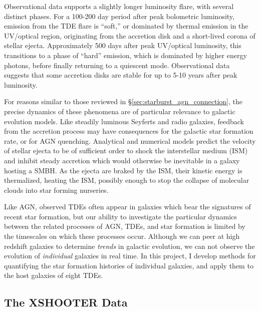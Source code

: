 \documentclass[a4paper,11pt]{article}
\begin{document}
Observational data supports a slightly longer luminosity flare, with several distinct phases. For a 100-200 day period after peak bolometric luminosity, emission from the TDE flare is ``soft,'' or dominated by thermal emission in the UV/optical region, originating from the accretion disk and a short-lived corona of stellar ejecta. Approximately 500 days after peak UV/optical luminosity, this transitions to a phase of ``hard'' emission, which is dominated by higher energy photons, before finally returning to a quiescent mode.\cite{Wevers_2021} Observational data suggests that some accretion disks are stable for up to 5-10 years after peak luminosity.\cite{van_Velzen_2019}

For reasons similar to those reviewed in \S\ref{sec:starburst_agn_connection}, the precise dynamics of these phenomena are of particular relevance to galactic evolution models. Like steadily luminous Seyferts and radio galaxies, feedback from the accretion process may have consequences for the galactic star formation rate, or for AGN quenching. Analytical and numerical models predict the velocity of stellar ejecta to be of sufficient order to shock the interstellar medium (ISM) and inhibit steady accretion which would otherwise be inevitable in a galaxy hosting a SMBH.\cite{Evans_1989} As the ejecta are braked by the ISM, their kinetic energy is thermalized, heating the ISM, possibly enough to stop the collapse of molecular  clouds into star forming nurseries.\cite{Rees_1988}

Like AGN, observed TDEs often appear in galaxies which bear the signatures of recent star formation, but our ability to investigate the particular dynamics between the related processes of AGN, TDEs, and star formation is limited by the timescales on which these processes occur. Although we can peer at high redshift galaxies to determine \textit{trends} in galactic evolution, we can not observe the evolution of \textit{individual} galaxies in real time. In this project, I develop methods for quantifying the star formation histories of individual galaxies, and apply them to the host galaxies of eight TDEs.

\subsection{The XSHOOTER Data}\label{sec:xshooter_data}
\end{document}
